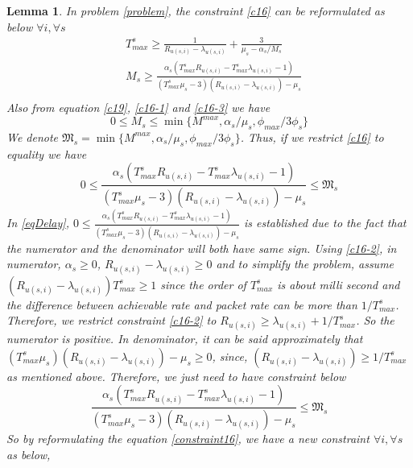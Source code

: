 \documentclass[conference]{IEEEtran}
\newtheorem{lemma}{Lemma}
\begin{document}
\begin{lemma}
In problem \eqref{problem}, the constraint \eqref{c16} can be reformulated as below
$ \forall i,\forall s$
\begin{equation}
\begin{split}
&T_{max}^s \geq\frac{1}{R_{u(s,i)} - \lambda_{u(s,i)}} + \frac{3}{\mu_s - \alpha_{s}/{M_s}}  \\
&M_s \geq \frac{\alpha_s(T_{max}^s R_{u(s,i)}-T_{max}^s\lambda_{u(s,i)} -1)}{(T_{max}^s\mu_s-3)(R_{u(s,i)}-\lambda_{u(s,i)}) - \mu_s }\\
\end{split}
\end{equation}
Also from equation \eqref{c19}, \eqref{c16-1} and \eqref{c16-3} we have
\begin{equation}
0\leq M_s \leq \min\{M^{max}, \alpha_s/\mu_s, \phi_{max}/{3\phi_s}\}
\end{equation}
We denote $ \mathfrak{M}_s= \min\{M^{max}, \alpha_s/\mu_s, \phi_{max}/{3\phi_s}\}$.
Thus, if we restrict \eqref{c16} to equality we have
\begin{equation}\label{eqDelay}
0\leq \frac{\alpha_s(T_{max}^s R_{u(s,i)}-T_{max}^s\lambda_{u(s,i)} -1)}{(T_{max}^s\mu_s-3)(R_{u(s,i)}-\lambda_{u(s,i)}) - \mu_s } \leq \mathfrak{M}_s
\end{equation}
In \eqref{eqDelay}, $0\leq \frac{\alpha_s(T_{max}^s R_{u(s,i)}-T_{max}^s\lambda_{u(s,i)} -1)}{(T_{max}^s\mu_s-3)(R_{u(s,i)}-\lambda_{u(s,i)}) - \mu_s }$ is established due to the fact that 
the numerator and the denominator will both have same sign. Using \eqref{c16-2},
in numerator, $\alpha_s \geq 0$, $ R_{u(s,i)}-\lambda_{u(s,i)} \geq 0$ and to simplify the problem, assume 
$(R_{u(s,i)}-\lambda_{u(s,i)})T_{max}^s \geq 1$ since the order of $T_{max}^s$ is about milli second and the difference between achievable rate and packet rate can be more than $1/T_{max}^s$.
Therefore, we restrict constraint \eqref{c16-2} to $R_{u(s,i)} \geq \lambda_{u(s,i)} + 1/T_{max}^s$.
So the numerator is positive.
In denominator, it can be said approximately that $(T_{max}^s\mu_s)(R_{u(s,i)}-\lambda_{u(s,i)}) - \mu_s \geq 0 $, since, $(R_{u(s,i)}-\lambda_{u(s,i)}) \geq 1/T_{max}^s$ as mentioned above.
Therefore, we just need to have constraint below
\begin{equation}\label{constraint16}
\frac{\alpha_s(T_{max}^s R_{u(s,i)}-T_{max}^s\lambda_{u(s,i)} -1)}{(T_{max}^s\mu_s-3)(R_{u(s,i)}-\lambda_{u(s,i)}) - \mu_s } \leq \mathfrak{M}_s
\end{equation}
So by reformulating the equation \eqref{constraint16}, we have a new constraint $\forall i, \forall s$ as below,

\end{lemma}
\end{document}
